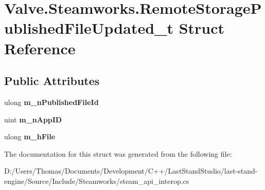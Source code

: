\hypertarget{structValve_1_1Steamworks_1_1RemoteStoragePublishedFileUpdated__t}{}\section{Valve.\+Steamworks.\+Remote\+Storage\+Published\+File\+Updated\+\_\+t Struct Reference}
\label{structValve_1_1Steamworks_1_1RemoteStoragePublishedFileUpdated__t}
\subsection*{Public Attributes}
\begin{DoxyCompactItemize}
\item 
\hypertarget{structValve_1_1Steamworks_1_1RemoteStoragePublishedFileUpdated__t_a044d18c2de4bb362c1c033d0f6e97d71}{}ulong {\bfseries m\+\_\+n\+Published\+File\+Id}\label{structValve_1_1Steamworks_1_1RemoteStoragePublishedFileUpdated__t_a044d18c2de4bb362c1c033d0f6e97d71}

\item 
\hypertarget{structValve_1_1Steamworks_1_1RemoteStoragePublishedFileUpdated__t_af761736959ece3fdce1c8963a52164d8}{}uint {\bfseries m\+\_\+n\+App\+I\+D}\label{structValve_1_1Steamworks_1_1RemoteStoragePublishedFileUpdated__t_af761736959ece3fdce1c8963a52164d8}

\item 
\hypertarget{structValve_1_1Steamworks_1_1RemoteStoragePublishedFileUpdated__t_a0b8736a1d0afe6f28d42c34a6c348f19}{}ulong {\bfseries m\+\_\+h\+File}\label{structValve_1_1Steamworks_1_1RemoteStoragePublishedFileUpdated__t_a0b8736a1d0afe6f28d42c34a6c348f19}

\end{DoxyCompactItemize}


The documentation for this struct was generated from the following file\+:\begin{DoxyCompactItemize}
\item 
D\+:/\+Users/\+Thomas/\+Documents/\+Development/\+C++/\+Last\+Stand\+Studio/last-\/stand-\/engine/\+Source/\+Include/\+Steamworks/steam\+\_\+api\+\_\+interop.\+cs\end{DoxyCompactItemize}
